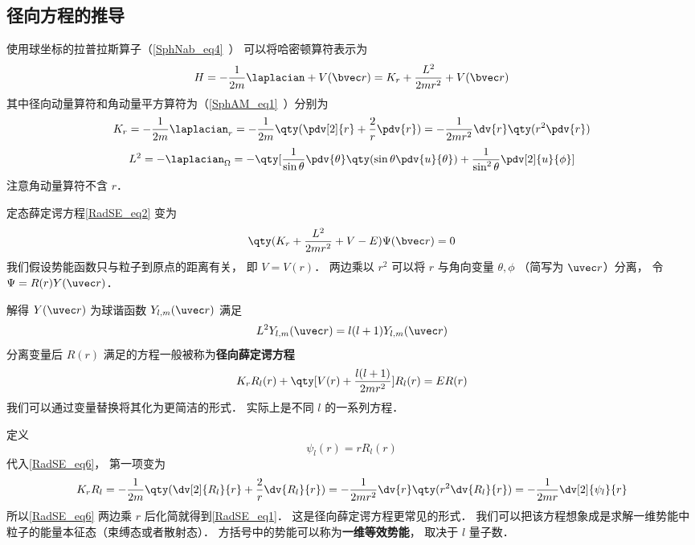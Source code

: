 \subsection{径向方程的推导}
使用球坐标的拉普拉斯算子（\autoref{SphNab_eq4}~） 可以将哈密顿算符表示为
\begin{equation}
H = -\frac{1}{2m} \laplacian + V(\bvec r) =  K_r + \frac{L^2}{2mr^2} + V(\bvec r)
\end{equation}
其中径向动量算符和角动量平方算符为（\autoref{SphAM_eq1}~）分别为
\begin{equation}
K_r =-\frac{1}{2m} \laplacian_r =  - \frac{1}{2m} \qty(\pdv[2]{r} + \frac2r \pdv{r}) = -\frac{1}{2mr^2} \dv{r} \qty(r^2\pdv{r})
\end{equation}
\begin{equation}\label{RadSE_eq3}
L^2 = -\laplacian_\Omega = -\qty[ \frac{1}{\sin\theta} \pdv{\theta} \qty(\sin \theta \pdv{u}{\theta}) + \frac{1}{\sin^2 \theta} \pdv[2]{u}{\phi}]
\end{equation}
注意角动量算符不含 $r$．

定态薛定谔方程\autoref{RadSE_eq2} 变为
\begin{equation}
\qty(K_r + \frac{L^2}{2mr^2} + V - E)\Psi(\bvec r) = 0
\end{equation}
我们假设势能函数只与粒子到原点的距离有关， 即 $V = V(r)$． 两边乘以 $r^2$ 可以将 $r$ 与角向变量 $\theta, \phi$ （简写为 $\uvec r$）分离， 令 $\Psi = R(r)Y(\uvec r)$．

解得 $Y(\uvec r)$ 为球谐函数 $Y_{l,m}(\uvec r)$ 满足
\begin{equation}
L^2 Y_{l,m}(\uvec r) = l(l+1) Y_{l,m}(\uvec r)
\end{equation}
分离变量后 $R(r)$ 满足的方程一般被称为\textbf{径向薛定谔方程}
\begin{equation}\label{RadSE_eq6}
K_r R_l(r) + \qty[V(r) + \frac{l(l+1)}{2mr^2} ]R_l(r) = ER(r)
\end{equation}
我们可以通过变量替换将其化为更简洁的形式． 实际上是不同 $l$ 的一系列方程．

定义
\begin{equation}
\psi_l(r) = r R_l(r)
\end{equation}
代入\autoref{RadSE_eq6}， 第一项变为
\begin{equation}
K_r R_l =  - \frac{1}{2m} \qty(\dv[2]{R_l}{r} + \frac2r \dv{R_l}{r}) = -\frac{1}{2mr^2} \dv{r} \qty(r^2\dv{R_l}{r}) =  -\frac{1}{2mr} \dv[2]{\psi_l}{r}
\end{equation}
所以\autoref{RadSE_eq6} 两边乘 $r$ 后化简就得到\autoref{RadSE_eq1}． 这是径向薛定谔方程更常见的形式． 我们可以把该方程想象成是求解一维势能中粒子的能量本征态（束缚态或者散射态）． 方括号中的势能可以称为\textbf{一维等效势能}， 取决于 $l$ 量子数．

